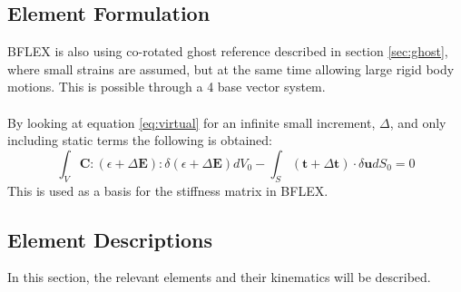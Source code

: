 \subsection{Element Formulation}
BFLEX is also using co-rotated ghost reference described in section \ref{sec:ghost}, 
where small strains are assumed, but at the same time allowing large rigid body motions. This is possible through a 4 base vector system. \\\\By looking at equation \ref{eq:virtual} for an infinite small increment, $\Delta$, and only including static terms the following is obtained: 
 \begin{equation}
    \int_V \boldsymbol{C}: (\epsilon + \Delta \boldsymbol{E}) : \delta (\epsilon + \Delta \boldsymbol{E})dV_0 - \int_S (\boldsymbol{t} + \Delta \boldsymbol{t}) \cdot \delta \boldsymbol{u} dS_0 =0
\end{equation}
 This is used as a basis for the stiffness matrix in BFLEX.
 

\subsection{Element Descriptions}
\label{sec:el}
In this section, the relevant elements and their kinematics will be described.
